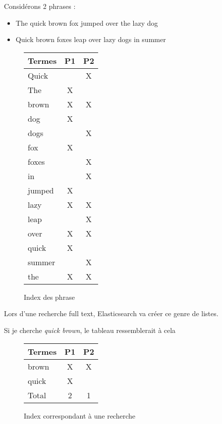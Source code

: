Considérons 2 phrases :
\begin{itemize}
    \item The quick brown fox jumped over the lazy dog
    \item Quick brown foxes leap over lazy dogs in summer
\end{itemize}

\begin{figure}[H]
\center
\begin{tabular}{|l||c|c|}
\hline
\textbf{Termes}   & \textbf{P1}    & \textbf{P2}\\ \hline  
Quick   &       &  X\\ \hline  
The     &   X   &   \\ \hline
brown   &   X   &  X\\ \hline
dog     &   X   &   \\ \hline
dogs    &       &  X\\ \hline
fox     &   X   &   \\ \hline
foxes   &       &  X\\ \hline
in      &       &  X\\ \hline
jumped  &   X   &   \\ \hline
lazy    &   X   &  X\\ \hline
leap    &       &  X\\ \hline
over    &   X   &  X\\ \hline
quick   &   X   &   \\ \hline
summer  &       &  X\\ \hline
the     &   X   &  X\\ \hline 
\end{tabular}
\caption{Index des phrase}
\end{figure}
Lors d'une recherche full text, Elasticsearch va créer ce genre de listes.

Si je cherche \emph{quick brown}, le tableau ressemblerait à cela 


\begin{figure}[H]
\center
\begin{tabular}{|l||c|c|}
\hline
\textbf{Termes}   & \textbf{P1}    & \textbf{P2}\\ \hline  
brown   &   X   &  X\\ \hline
quick   &   X   &   \\ \hline \hline
Total   &   2   &  1 \\ \hline
\end{tabular}
\caption{Index correspondant à une recherche}
\end{figure}

